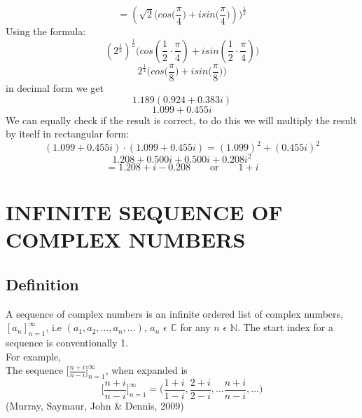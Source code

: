 \documentclass[a4paper, 12pt]{report}
\begin{document}
{\begin{equation}
= (\sqrt{2}\bigg(cos\bigg(\frac{\pi}{4}\bigg) + isin\bigg(\frac{\pi}{4}\bigg))\bigg)^{\frac{1}{2}}
\end{equation}
Using the formula:
\begin{equation*}
(2^{\frac{1}{2}})^{\frac{1}{2}}\bigg(cos(\frac{1}{2}\cdot\frac{\pi}{4}) + isin(\frac{1}{2}\cdot\frac{\pi}{4})\bigg)
\end{equation*}
\begin{equation*}
2^{\frac{1}{4}}\bigg(cos\bigg(\frac{\pi}{8}\bigg) + isin\bigg(\frac{\pi}{8}\bigg)\bigg)
\end{equation*}
in decimal form we get
\begin{equation*}
1.189(0.924 + 0.383i)
\end{equation*}
\begin{equation*}
1.099 + 0.455i
\end{equation*}
We can equally check if the result is correct, to do this we will multiply the result by itself in rectangular form:\\
\begin{equation*}
(1.099 + 0.455i)\cdot(1.099 + 0.455i) = (1.099)^2 + (0.455i)^2
\end{equation*}
\begin{equation*}
1.208 + 0.500i + 0.500i + 0.208i^2
\end{equation*}
\begin{equation*}
= 1.208 + i - 0.208 \qquad \text{or} \qquad 1 + i
\end{equation*}

\newpage
\chapter{INFINITE SEQUENCE OF COMPLEX NUMBERS}
\section{Definition}
A sequence of complex numbers is an infinite ordered list of complex numbers, $[a_n]^\infty_{n=1}$, i.e $(a_1, a_2,...,a_n,...)$, $a_n$ $\epsilon$ $\mathbb{C}$ for any $n$ $\epsilon$ $\mathbb{N}$.
The start index for a sequence is conventionally 1.\\
For example,\\
The sequence $\bigg[\frac{n + i}{n - i}\bigg]^\infty_{n=1}$, when expanded is 
\begin{equation*}
\bigg[\frac{n + i}{n - i}\bigg]^\infty_{n=1} = \bigg(\frac{1 + i}{1 - i}, \frac{2 + i}{2 - i},...\frac{n + i}{n - i},...\bigg)
\end{equation*}
(Murray, Saymaur, John \& Dennis, 2009)

}
\end{document}
